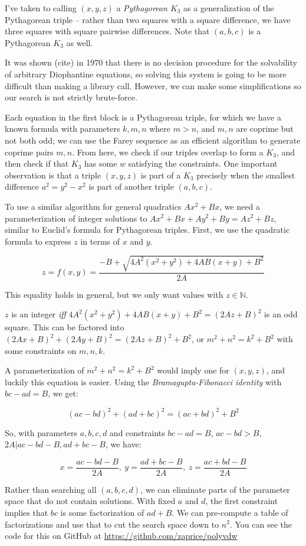 \documentclass[a4paper]{amsproc}
\theoremstyle{plain}
\newcommand{\N} {\mathbb{N}}
\begin{document}
I've taken to calling $(x,y,z)$ a \textit{Pythagorean $K_3$} as a generalization of the Pythagorean triple --
rather than two squares with a square difference, we have three squares with square pairwise differences.
Note that $(a,b,c)$ is a Pythagorean $K_3$ as well.

It was shown (cite) in 1970 that there is no decision procedure for the solvability of arbitrary Diophantine equations, so solving this system is going to be more difficult than making a library call.
However, we can make some simplifications so our search is not strictly brute-force.

Each equation in the first block is a Pythagorean triple, for which we have a known formula with parameters $k,m,n$ where $m > n$, and $m,n$ are coprime but not both odd;
we can use the Farey sequence as an efficient algorithm to generate coprime pairs $m,n$.
From here, we check if our triples overlap to form a $K_3$, and then check if that $K_3$ has some $w$ satisfying the constraints.
One important observation is that a triple $(x,y,z)$ is part of a $K_3$ precisely when the smallest difference $a^2 = y^2 - x^2$ is part of another
triple $(a,b,c)$.

To use a similar algorithm for general quadratics $Ax^2+Bx$, we need a parameterization of integer solutions to $Ax^2+Bx + Ay^2+By = Az^2+Bz$,
similar to Euclid's formula for Pythagorean triples.
First, we use the quadratic formula to express $z$ in terms of $x$ and $y$.

$$z = f(x,y) = \frac{-B+\sqrt{4A^2(x^2+y^2)+4AB(x+y)+B^2}}{2A}$$

This equality holds in general, but we only want values with $z\in\N$.

$z$ is an integer \textit{iff} $4A^2(x^2+y^2)+4AB(x+y)+B^2=(2Az+B)^2$ is an odd square.
This can be factored into $(2Ax+B)^2+(2Ay+B)^2=(2Az+B)^2+B^2$, or $m^2+n^2=k^2+B^2$ with some constraints on $m,n,k$.

A parameterization of $m^2+n^2=k^2+B^2$ would imply one for $(x,y,z)$, and luckily this equation is easier.
Using the \textit{Bramagupta-Fibonacci identity} with ${bc-ad=B}$, we get:

$$(ac-bd)^2 + (ad+bc)^2 = (ac+bd)^2 + B^2$$

So, with parameters $a,b,c,d$ and constraints $bc-ad=B$, $ac-bd> B$, ${2A\vert ac-bd-B}, ad+bc-B$, we have:

$$x = \frac{ac-bd-B}{2A},\ y = \frac{ad+bc-B}{2A},\ z = \frac{ac+bd-B}{2A}$$

Rather than searching all $(a,b,c,d)$, we can eliminate parts of the parameter space that do not contain solutions.
With fixed $a$ and $d$, the first constraint implies that $bc$ is some factorization of $ad + B$.
We can pre-compute a table of factorizations and use that to cut the search space down to $n^2$.
You can see the code for this on GitHub at \url{https://github.com/zaprice/polyvdw}
\end{document}
